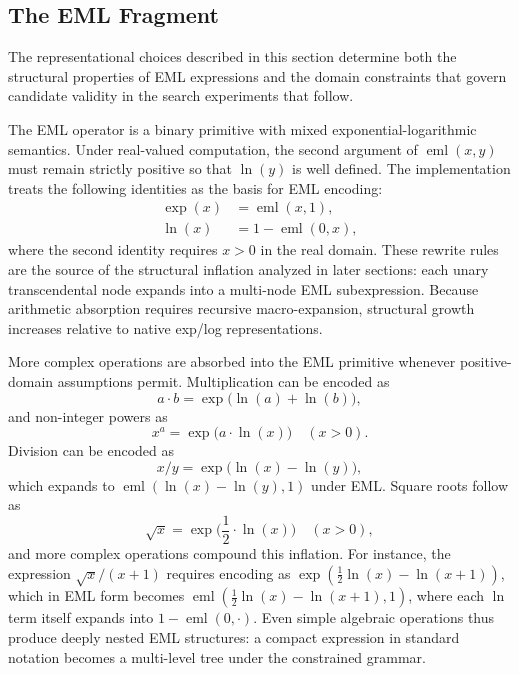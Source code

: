 \documentclass[runningheads]{llncs}
\newcommand{\eml}{\operatorname{eml}}
\newcommand{\expf}{\operatorname{exp}}
\newcommand{\lnf}{\operatorname{ln}}
\begin{document}
\subsection{The EML Fragment}
The representational choices described in this section determine both the
structural properties of EML expressions and the domain constraints that
govern candidate validity in the search experiments that follow.

The EML operator is a binary primitive with mixed exponential-logarithmic
semantics. Under real-valued computation, the second argument of $\eml(x, y)$
must remain strictly positive so that $\lnf(y)$ is well defined. The
implementation treats the following identities as the basis for EML encoding:
\begin{align}
  \expf(x) &= \eml(x, 1), \label{eq:eml_exp} \\
  \lnf(x)  &= 1 - \eml(0, x), \label{eq:eml_ln}
\end{align}
where the second identity requires $x > 0$ in the real domain. These rewrite
rules are the source of the structural inflation analyzed in later sections:
each unary transcendental node expands into a multi-node EML subexpression. Because arithmetic absorption requires recursive macro-expansion, structural growth increases relative to native exp/log representations.

More complex operations are absorbed into the EML primitive whenever
positive-domain assumptions permit. Multiplication can be encoded as
\begin{equation}\label{eq:eml_mul}
  a \cdot b = \expf\bigl(\lnf(a) + \lnf(b)\bigr),
\end{equation}
and non-integer powers as
\begin{equation}\label{eq:eml_pow}
  x^a = \expf\bigl(a \cdot \lnf(x)\bigr) \quad (x > 0).
\end{equation}
Division can be encoded as
\begin{equation}\label{eq:eml_div}
  x / y = \expf\bigl(\lnf(x) - \lnf(y)\bigr),
\end{equation}
which expands to $\eml(\lnf(x) - \lnf(y), 1)$ under EML. Square roots follow as
\begin{equation}\label{eq:eml_sqrt}
  \sqrt{x} = \expf\bigl(\frac{1}{2} \cdot \lnf(x)\bigr) \quad (x > 0),
\end{equation}
and more complex operations compound this inflation. For instance, the expression $\sqrt{x} / (x + 1)$ requires encoding as $\expf(\frac{1}{2} \lnf(x) - \lnf(x + 1))$, which in EML form becomes $\eml(\frac{1}{2} \lnf(x) - \lnf(x + 1), 1)$, where each $\lnf$ term itself expands into $1 - \eml(0, \cdot)$. Even simple algebraic operations thus produce deeply nested EML structures: a compact expression in standard notation becomes a multi-level tree under the constrained grammar.
\end{document}
